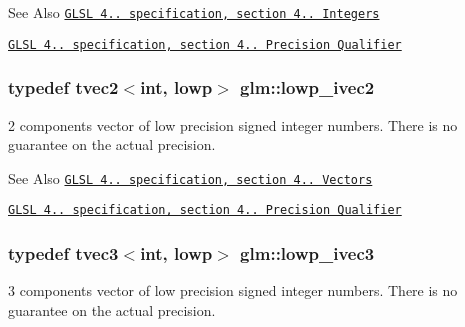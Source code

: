 \begin{DoxySeeAlso}{See Also}
\href{http://www.opengl.org/registry/doc/GLSLangSpec.4.20.8.pdf}{\tt G\-L\-S\-L 4.. specification, section 4.. Integers} 

\href{http://www.opengl.org/registry/doc/GLSLangSpec.4.20.8.pdf}{\tt G\-L\-S\-L 4.. specification, section 4.. Precision Qualifier} 
\end{DoxySeeAlso}
\hypertarget{group__core__precision_gafae8c6e9da91f4c6c1b85af5b8513097}{
\subsubsection[{lowp\-\_\-ivec2}]{\setlength{\rightskip}{0pt plus 5cm}typedef tvec2$<$int, lowp$>$ {\bf glm\-::lowp\-\_\-ivec2}}}\label{group__core__precision_gafae8c6e9da91f4c6c1b85af5b8513097}
2 components vector of low precision signed integer numbers. There is no guarantee on the actual precision.

\begin{DoxySeeAlso}{See Also}
\href{http://www.opengl.org/registry/doc/GLSLangSpec.4.20.8.pdf}{\tt G\-L\-S\-L 4.. specification, section 4.. Vectors} 

\href{http://www.opengl.org/registry/doc/GLSLangSpec.4.20.8.pdf}{\tt G\-L\-S\-L 4.. specification, section 4.. Precision Qualifier} 
\end{DoxySeeAlso}
\hypertarget{group__core__precision_gad03cd497aea76c671fda2ce1d697e905}{
\subsubsection[{lowp\-\_\-ivec3}]{\setlength{\rightskip}{0pt plus 5cm}typedef tvec3$<$int, lowp$>$ {\bf glm\-::lowp\-\_\-ivec3}}}\label{group__core__precision_gad03cd497aea76c671fda2ce1d697e905}
3 components vector of low precision signed integer numbers. There is no guarantee on the actual precision.

